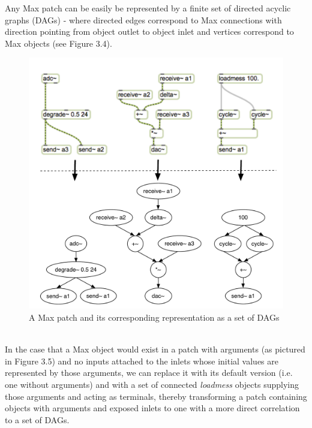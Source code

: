 \documentclass[a4paper,12pt]{report} 	%
\numberwithin{figure}{chapter}
\numberwithin{table}{chapter}
\numberwithin{equation}{chapter}
\begin{document}
\begin{flushleft}
Any Max patch can be easily be represented by a finite set of directed acyclic graphs (DAGs) - where directed edges correspond to Max connections with direction pointing from object outlet to object inlet and vertices correspond to Max objects (see Figure 3.4).
\begin{figure}[h!]
\begin{center}
\includegraphics[scale=0.7]{MaxDAGs}
\caption[A Max patch as a set of DAGs]{A Max patch and its corresponding representation as a set of DAGs}
\end{center}
\end{figure}
\\
In the case that a Max object would exist in a patch with arguments (as pictured in Figure 3.5) and no inputs attached to the inlets whose initial values are represented by those arguments, we can replace it with its default version (i.e. one without arguments) and with a set of connected \emph{loadmess} objects supplying those arguments and acting as terminals, thereby transforming a patch containing objects with arguments and exposed inlets to one with a more direct correlation to a set of DAGs.
\begin{figure}[h!]
\begin{center}

\end{center}
\end{figure}
\end{flushleft}
\end{document}
